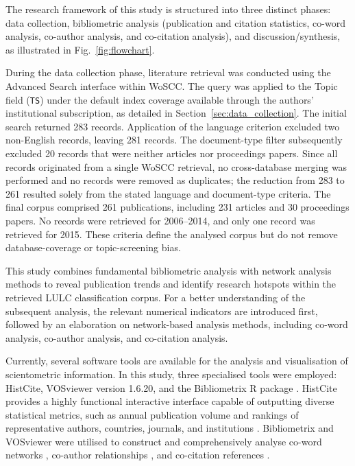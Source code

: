 \documentclass[]{interact}
\theoremstyle{plain}%
\theoremstyle{definition}
\theoremstyle{remark}
\begin{document}
The research framework of this study is structured into three distinct phases: data collection, bibliometric analysis (publication and citation statistics, co-word analysis, co-author analysis, and co-citation analysis), and discussion/synthesis, as illustrated in Fig.~\ref{fig:flowchart}.

During the data collection phase, literature retrieval was conducted using the Advanced Search interface within WoSCC. The query was applied to the Topic field (\texttt{TS}) under the default index coverage available through the authors' institutional subscription, as detailed in Section~\ref{sec:data_collection}. The initial search returned 283 records. Application of the language criterion excluded two non-English records, leaving 281 records. The document-type filter subsequently excluded 20 records that were neither articles nor proceedings papers. Since all records originated from a single WoSCC retrieval, no cross-database merging was performed and no records were removed as duplicates; the reduction from 283 to 261 resulted solely from the stated language and document-type criteria. The final corpus comprised 261 publications, including 231 articles and 30 proceedings papers. No records were retrieved for 2006--2014, and only one record was retrieved for 2015. These criteria define the analysed corpus but do not remove database-coverage or topic-screening bias.

This study combines fundamental bibliometric analysis \citep{14,16} with network analysis methods \citep{13} to reveal publication trends and identify research hotspots within the retrieved LULC classification corpus. For a better understanding of the subsequent analysis, the relevant numerical indicators are introduced first, followed by an elaboration on network-based analysis methods, including co-word analysis, co-author analysis, and co-citation analysis. 


Currently, several software tools are available for the analysis and visualisation of scientometric information. In this study, three specialised tools were employed: HistCite, VOSviewer version 1.6.20, and the Bibliometrix R package \citep{15}. HistCite provides a highly functional interactive interface capable of outputting diverse statistical metrics, such as annual publication volume and rankings of representative authors, countries, journals, and institutions \citep{9}. Bibliometrix and VOSviewer were utilised to construct and comprehensively analyse co-word networks \citep{17}, co-author relationships \citep{18}, and co-citation references \citep{19}.
\end{document}
